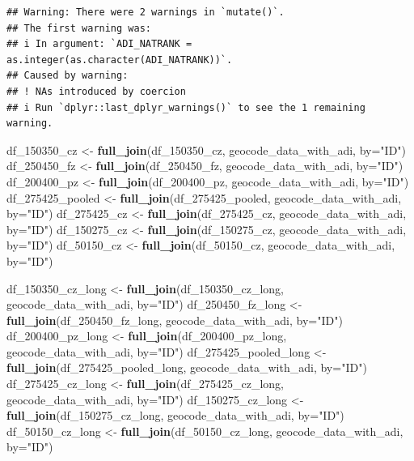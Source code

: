 \documentclass[
]{article}
\newenvironment{Shaded}{\begin{snugshade}}{\end{snugshade}}
\newcommand{\AttributeTok}[1]{\textcolor[rgb]{0.13,0.29,0.53}{#1}}
\newcommand{\FunctionTok}[1]{\textcolor[rgb]{0.13,0.29,0.53}{\textbf{#1}}}
\newcommand{\NormalTok}[1]{#1}
\newcommand{\OtherTok}[1]{\textcolor[rgb]{0.56,0.35,0.01}{#1}}
\newcommand{\StringTok}[1]{\textcolor[rgb]{0.31,0.60,0.02}{#1}}
\begin{document}
\begin{verbatim}
## Warning: There were 2 warnings in `mutate()`.
## The first warning was:
## i In argument: `ADI_NATRANK = as.integer(as.character(ADI_NATRANK))`.
## Caused by warning:
## ! NAs introduced by coercion
## i Run `dplyr::last_dplyr_warnings()` to see the 1 remaining warning.
\end{verbatim}

\begin{Shaded}
\begin{Highlighting}[]
\NormalTok{df\_150350\_cz }\OtherTok{\textless{}{-}} \FunctionTok{full\_join}\NormalTok{(df\_150350\_cz, geocode\_data\_with\_adi, }\AttributeTok{by=}\StringTok{"ID"}\NormalTok{)}
\NormalTok{df\_250450\_fz }\OtherTok{\textless{}{-}} \FunctionTok{full\_join}\NormalTok{(df\_250450\_fz, geocode\_data\_with\_adi, }\AttributeTok{by=}\StringTok{"ID"}\NormalTok{)}
\NormalTok{df\_200400\_pz }\OtherTok{\textless{}{-}} \FunctionTok{full\_join}\NormalTok{(df\_200400\_pz, geocode\_data\_with\_adi, }\AttributeTok{by=}\StringTok{"ID"}\NormalTok{)}
\NormalTok{df\_275425\_pooled }\OtherTok{\textless{}{-}} \FunctionTok{full\_join}\NormalTok{(df\_275425\_pooled, geocode\_data\_with\_adi, }\AttributeTok{by=}\StringTok{"ID"}\NormalTok{)}
\NormalTok{df\_275425\_cz }\OtherTok{\textless{}{-}} \FunctionTok{full\_join}\NormalTok{(df\_275425\_cz, geocode\_data\_with\_adi, }\AttributeTok{by=}\StringTok{"ID"}\NormalTok{)}
\NormalTok{df\_150275\_cz }\OtherTok{\textless{}{-}} \FunctionTok{full\_join}\NormalTok{(df\_150275\_cz, geocode\_data\_with\_adi, }\AttributeTok{by=}\StringTok{"ID"}\NormalTok{)}
\NormalTok{df\_50150\_cz }\OtherTok{\textless{}{-}} \FunctionTok{full\_join}\NormalTok{(df\_50150\_cz, geocode\_data\_with\_adi, }\AttributeTok{by=}\StringTok{"ID"}\NormalTok{)}

\NormalTok{df\_150350\_cz\_long }\OtherTok{\textless{}{-}} \FunctionTok{full\_join}\NormalTok{(df\_150350\_cz\_long, geocode\_data\_with\_adi, }\AttributeTok{by=}\StringTok{"ID"}\NormalTok{)}
\NormalTok{df\_250450\_fz\_long }\OtherTok{\textless{}{-}} \FunctionTok{full\_join}\NormalTok{(df\_250450\_fz\_long, geocode\_data\_with\_adi, }\AttributeTok{by=}\StringTok{"ID"}\NormalTok{)}
\NormalTok{df\_200400\_pz\_long }\OtherTok{\textless{}{-}} \FunctionTok{full\_join}\NormalTok{(df\_200400\_pz\_long, geocode\_data\_with\_adi, }\AttributeTok{by=}\StringTok{"ID"}\NormalTok{)}
\NormalTok{df\_275425\_pooled\_long }\OtherTok{\textless{}{-}} \FunctionTok{full\_join}\NormalTok{(df\_275425\_pooled\_long, geocode\_data\_with\_adi, }\AttributeTok{by=}\StringTok{"ID"}\NormalTok{)}
\NormalTok{df\_275425\_cz\_long }\OtherTok{\textless{}{-}} \FunctionTok{full\_join}\NormalTok{(df\_275425\_cz\_long, geocode\_data\_with\_adi, }\AttributeTok{by=}\StringTok{"ID"}\NormalTok{)}
\NormalTok{df\_150275\_cz\_long }\OtherTok{\textless{}{-}} \FunctionTok{full\_join}\NormalTok{(df\_150275\_cz\_long, geocode\_data\_with\_adi, }\AttributeTok{by=}\StringTok{"ID"}\NormalTok{)}
\NormalTok{df\_50150\_cz\_long }\OtherTok{\textless{}{-}} \FunctionTok{full\_join}\NormalTok{(df\_50150\_cz\_long, geocode\_data\_with\_adi, }\AttributeTok{by=}\StringTok{"ID"}\NormalTok{)}
\end{Highlighting}
\end{Shaded}
\end{document}
